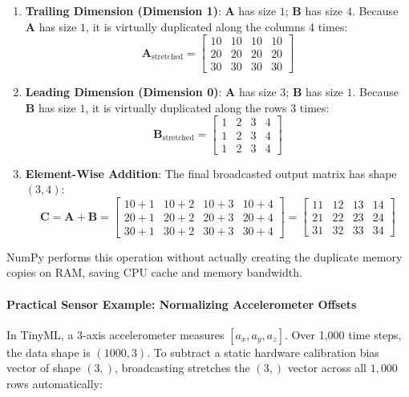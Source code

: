 \begin{enumerate}
    \item \textbf{Trailing Dimension (Dimension 1)}:
    $\mathbf{A}$ has size $1$; $\mathbf{B}$ has size $4$. 
    Because $\mathbf{A}$ has size $1$, it is virtually duplicated along the columns $4$ times:
    \begin{equation*}
    \mathbf{A}_{\text{stretched}} = \begin{bmatrix} 10 & 10 & 10 & 10 \\ 20 & 20 & 20 & 20 \\ 30 & 30 & 30 & 30 \end{bmatrix}
    \end{equation*}

    \item \textbf{Leading Dimension (Dimension 0)}:
    $\mathbf{A}$ has size $3$; $\mathbf{B}$ has size $1$. 
    Because $\mathbf{B}$ has size $1$, it is virtually duplicated along the rows $3$ times:
    \begin{equation*}
    \mathbf{B}_{\text{stretched}} = \begin{bmatrix} 1 & 2 & 3 & 4 \\ 1 & 2 & 3 & 4 \\ 1 & 2 & 3 & 4 \end{bmatrix}
    \end{equation*}

    \item \textbf{Element-Wise Addition}:
    The final broadcasted output matrix has shape $(3, 4)$:
    \begin{equation*}
    \mathbf{C} = \mathbf{A} + \mathbf{B} = \begin{bmatrix} 
    10+1 & 10+2 & 10+3 & 10+4 \\ 
    20+1 & 20+2 & 20+3 & 20+4 \\ 
    30+1 & 30+2 & 30+3 & 30+4 
    \end{bmatrix} = \begin{bmatrix} 
    11 & 12 & 13 & 14 \\ 
    21 & 22 & 23 & 24 \\ 
    31 & 32 & 33 & 34 
    \end{bmatrix}
    \end{equation*}
\end{enumerate}

NumPy performs this operation without actually creating the duplicate memory copies on RAM, saving CPU cache and memory bandwidth.

\paragraph{Practical Sensor Example: Normalizing Accelerometer Offsets}
In TinyML, a 3-axis accelerometer measures $[a_x, a_y, a_z]$. Over 1,000 time steps, the data shape is $(1000, 3)$. To subtract a static hardware calibration bias vector of shape $(3,)$, broadcasting stretches the $(3,)$ vector across all $1{,}000$ rows automatically:

